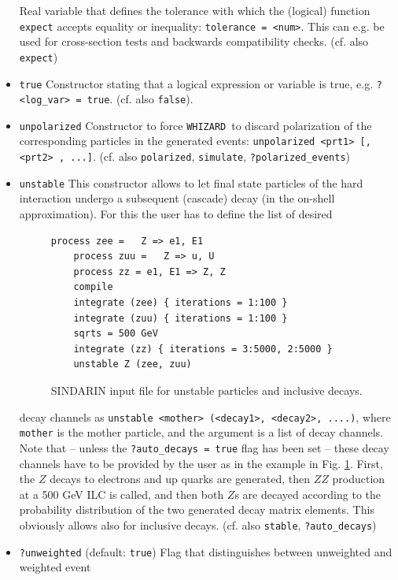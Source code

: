 \documentclass[12pt]{book}
\newcommand{\ttt}[1]{\texttt{#1}}
\newcommand{\whizard}{\texttt{WHIZARD}}
\begin{document}
\begin{itemize}
Real variable that defines the tolerance with which the (logical)
function \ttt{expect} accepts equality or inequality:
\ttt{tolerance = <num>}. This can e.g. be used for cross-section tests
and backwards compatibility checks.
(cf. also \ttt{expect})
\item
\ttt{true} \newline
Constructor stating that a logical expression or variable is true,
e.g. \ttt{?<log\_var> = true}. (cf. also \ttt{false}).
\item
\ttt{unpolarized} \newline
Constructor to force \whizard\ to discard polarization of the
corresponding particles in the generated events: \ttt{unpolarized <prt1>
  [, <prt2> , ...]}. (cf. also \ttt{polarized}, \ttt{simulate},
\ttt{?polarized\_events})
\item
\ttt{unstable} \newline
This constructor allows to let final state particles of the hard
interaction undergo a subsequent (cascade) decay (in the on-shell
approximation). For this the user has to define the list of desired
\begin{figure}
  \begin{Verbatim}[frame=single]
    process zee =   Z => e1, E1
    process zuu =   Z => u, U 
    process zz = e1, E1 => Z, Z
    compile
    integrate (zee) { iterations = 1:100 }
    integrate (zuu) { iterations = 1:100 }
    sqrts = 500 GeV
    integrate (zz) { iterations = 3:5000, 2:5000 }
    unstable Z (zee, zuu)
 \end{Verbatim}
  \caption{\label{fig:ex_unstable} SINDARIN input file for unstable
    particles and inclusive decays.}
\end{figure}
decay channels as \ttt{unstable <mother> (<decay1>, <decay2>, ....)},
where \ttt{mother} is the mother particle, and the argument is a list
of decay channels. Note that -- unless the \ttt{?auto\_decays = true}
flag has been set -- these decay channels have to be provided by the
user as  in the example in Fig. \ref{fig:ex_unstable}. First, the $Z$
decays to electrons and up quarks are generated, then $ZZ$ production
at a 500 GeV ILC is called, and then both $Z$s are decayed according
to the probability distribution of the two generated decay matrix 
elements. This obviously allows also for inclusive decays. 
(cf. also \ttt{stable}, \ttt{?auto\_decays})
\item
\ttt{?unweighted} \qquad (default: \ttt{true}) \newline
Flag that distinguishes between unweighted and weighted event

\end{itemize}
\end{document}
